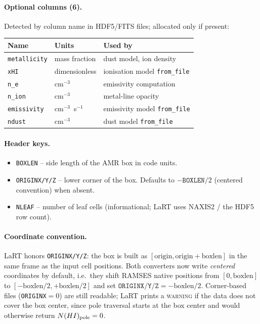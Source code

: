 \documentclass[english,a4paper]{my_memo}
\begin{document}
\paragraph{Optional columns (6).} Detected by column name in HDF5/FITS
files; allocated only if present:

\begin{longtable}{lll}
\toprule
Name & Units & Used by \\
\midrule
\texttt{metallicity} & mass fraction & dust model, ion density \\
\texttt{xHI}         & dimensionless & ionisation model \texttt{from\_file} \\
\texttt{n\_e}        & cm$^{-3}$     & emissivity computation \\
\texttt{n\_ion}      & cm$^{-3}$     & metal-line opacity \\
\texttt{emissivity}  & cm$^{-3}$~s$^{-1}$ & emissivity model \texttt{from\_file} \\
\texttt{ndust}       & cm$^{-3}$     & dust model \texttt{from\_file} \\
\bottomrule
\end{longtable}

\paragraph{Header keys.}
\begin{itemize}
  \item \texttt{BOXLEN}            -- side length of the AMR box in code units.
  \item \texttt{ORIGINX/Y/Z}       -- lower corner of the box.  Defaults to
        $-\texttt{BOXLEN}/2$ (centered convention) when absent.
  \item \texttt{NLEAF}             -- number of leaf cells (informational; LaRT
        uses NAXIS2 / the HDF5 row count).
\end{itemize}

\paragraph{Coordinate convention.}
LaRT honors \texttt{ORIGINX/Y/Z}: the box is built as $[\text{origin},
\text{origin}+\text{boxlen}]$ in the same frame as the input cell positions.
Both converters now write \emph{centered} coordinates by default, i.e.\ they
shift RAMSES native positions from $[0, \text{boxlen}]$ to $[-\text{boxlen}/2,
+\text{boxlen}/2]$ and set $\texttt{ORIGINX/Y/Z}=-\text{boxlen}/2$.  Corner-based
files (\texttt{ORIGINX}$=0$) are still readable; LaRT prints a
\textsc{warning} if the data does not cover the box center, since pole
traversal starts at the box center and would otherwise return
$N(HI)_{\rm pole}=0$.
\end{document}
